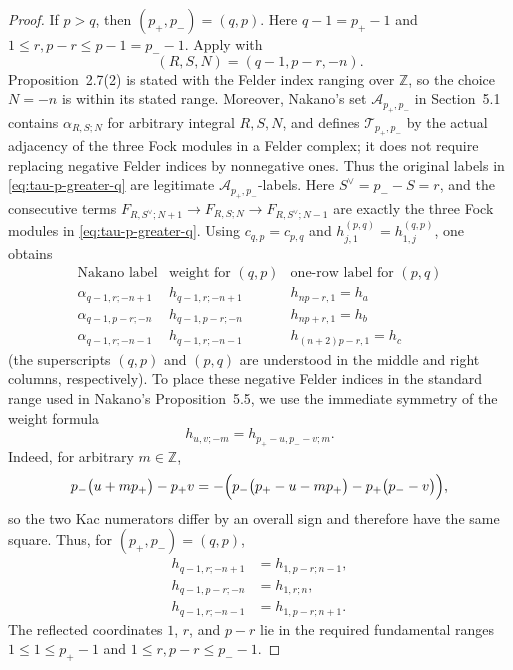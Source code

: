 \documentclass[12pt,leqno]{amsart}
\numberwithin{equation}{section}
\def\Z{\mathbb{Z}}
\begin{document}
\begin{proof}
If $p>q$, then $(p_+,p_-)=(q,p)$.  Here
$q-1=p_+-1$ and $1\le r,p-r\le p-1=p_--1$.  Apply
\cite[Proposition~2.7(2)]{Nakano} with
\[
 (R,S,N)=(q-1,p-r,-n).
\]
Proposition~2.7(2) is stated with the Felder index ranging over
$\Z$, so the choice $N=-n$ is within its stated range.  Moreover,
Nakano's set $\mathcal A_{p_+,p_-}$ in Section~5.1 contains
$\alpha_{R,S;N}$ for arbitrary integral $R,S,N$, and
\cite[Definition~5.6]{Nakano} defines $\mathcal T_{p_+,p_-}$ by the
actual adjacency of the three Fock modules in a Felder complex; it does
not require replacing negative Felder indices by nonnegative ones.  Thus
the original labels in \eqref{eq:tau-p-greater-q} are legitimate
$\mathcal A_{p_+,p_-}$-labels.  Here $S^\vee=p_- -S=r$, and the consecutive
terms $F_{R,S^\vee;N+1}\to F_{R,S;N}\to F_{R,S^\vee;N-1}$ are exactly the
three Fock modules in \eqref{eq:tau-p-greater-q}.  Using $c_{q,p}=c_{p,q}$ and
$h_{j,1}^{(p,q)}=h_{1,j}^{(q,p)}$, one obtains
\[
\begin{array}{c|c|c}
 \text{Nakano label}&\text{weight for }(q,p)&\text{one-row label for }(p,q)\\ \hline
 \alpha_{q-1,r;-n+1}&h_{q-1,r;-n+1}&h_{np-r,1}=h_a\\
 \alpha_{q-1,p-r;-n}&h_{q-1,p-r;-n}&h_{np+r,1}=h_b\\
 \alpha_{q-1,r;-n-1}&h_{q-1,r;-n-1}&h_{(n+2)p-r,1}=h_c
\end{array}
\]
(the superscripts $(q,p)$ and $(p,q)$ are understood in the middle and
right columns, respectively).  To place these negative Felder indices in
the standard range used in Nakano's Proposition~5.5, we use the immediate
symmetry of the weight formula
\begin{equation}\label{eq:Nakano-negative-index}
 h_{u,v;-m}=h_{p_+-u,p_--v;m}.
\end{equation}
Indeed, for arbitrary $m\in\Z$,
\[
 p_-\bigl(u+mp_+\bigr)-p_+v
 =-\Bigl(
 p_-\bigl(p_+-u-mp_+\bigr)-p_+\bigl(p_--v\bigr)
 \Bigr),
\]
so the two Kac numerators differ by an overall sign and therefore have
the same square.  Thus, for $(p_+,p_-)=(q,p)$,
\[
\begin{aligned}
 h_{q-1,r;-n+1}&=h_{1,p-r;n-1},\\
 h_{q-1,p-r;-n}&=h_{1,r;n},\\
 h_{q-1,r;-n-1}&=h_{1,p-r;n+1}.
\end{aligned}
\]
The reflected coordinates $1$, $r$, and $p-r$ lie in the required
fundamental ranges $1\le1\le p_+-1$ and
$1\le r,p-r\le p_--1$.


\end{proof}
\end{document}
